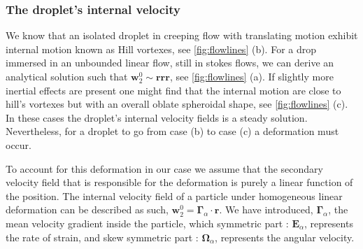\subsubsection{The droplet's internal velocity}


We know that an isolated droplet in creeping flow with translating motion exhibit internal motion known as Hill vortexes, see \ref{fig:flowlines} (b). 
For a drop immersed in an unbounded linear flow, still in stokes flows, we can derive an analytical solution such that $\textbf{w}_2^0 \sim \textbf{rrr}$, see \ref{fig:flowlines} (a). 
If slightly more inertial effects are present one might find that the internal motion are close to hill's vortexes but with an overall oblate spheroidal shape, see \ref{fig:flowlines} (c). 
In these cases the droplet's internal velocity fields is a steady solution.
Nevertheless, for a droplet to go from case (b) to case (c) a deformation must occur. 

To account for this deformation in our case we assume that the secondary velocity field that is responsible for the deformation is purely a linear function of the position. 
The internal velocity field of a particle under homogeneous linear deformation can be described as such, $\textbf{w}_2^0 = \bm\Gamma_\alpha \cdot \textbf{r}$. 
We have introduced, $\bm\Gamma_\alpha$, the mean velocity gradient inside the particle, which symmetric part : $\textbf{E}_\alpha$, represents the rate of strain, and skew symmetric part : $\bm\Omega_\alpha$, represents the angular velocity. 

